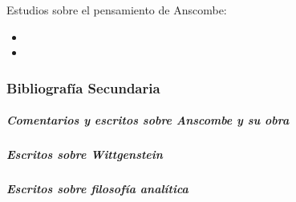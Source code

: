 \noindent Estudios sobre el pensamiento de Anscombe:

\begin{itemize}
    \item {}
    \item {}
\end{itemize}

\subsubsection{Bibliografía Secundaria}
\subparagraph{Comentarios y escritos sobre Anscombe y su obra}
\subparagraph{Escritos sobre Wittgenstein}
\subparagraph{Escritos sobre filosofía analítica}

